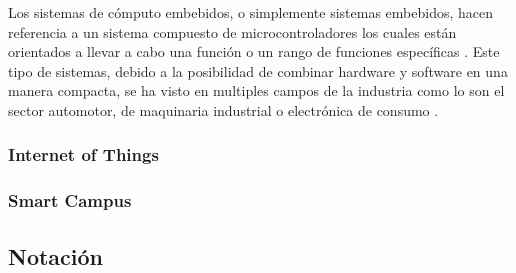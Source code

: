 \documentclass[12pt]{article}
\begin{document}
    Los sistemas de cómputo embebidos, o simplemente sistemas embebidos, hacen referencia a un sistema compuesto de microcontroladores los cuales están orientados a llevar a cabo una función o un rango de funciones específicas \cite{heath2002embedded}. Este tipo de sistemas, debido a la posibilidad de combinar hardware y software en una manera compacta, se ha visto en multiples campos de la industria como lo son el sector automotor, de maquinaria industrial o electrónica de consumo \cite{deichmann_2022}.


    \subsubsection{Internet of Things}


    \subsubsection{Smart Campus}

    
    \subsection{Notación} %



\end{document}
